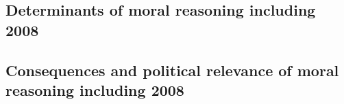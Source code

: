 \documentclass[12pt]{article}
\begin{document}
\clearpage
\subsection{Determinants of moral reasoning including 2008}







\clearpage
\subsection{Consequences and political relevance of moral reasoning including 2008}





\end{document}
